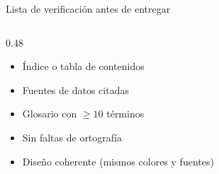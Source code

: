 \documentclass[aspectratio=169, 10pt, spanish]{beamer}
\begin{document}
\begin{frame}{Lista de verificación antes de entregar}
\begin{columns}[T]
\begin{column}{0.48\textwidth}
\begin{tcolorbox}
\begin{itemize}
          \item[$\square$] Índice o tabla de contenidos
          \item[$\square$] Fuentes de datos citadas
          \item[$\square$] Glosario con $\geq 10$ términos
          \item[$\square$] Sin faltas de ortografía
          \item[$\square$] Diseño coherente (mismos colores y fuentes)
        \end{itemize}
      \end{tcolorbox}
    \end{column}
  \end{columns}
\end{frame}

\end{document}

